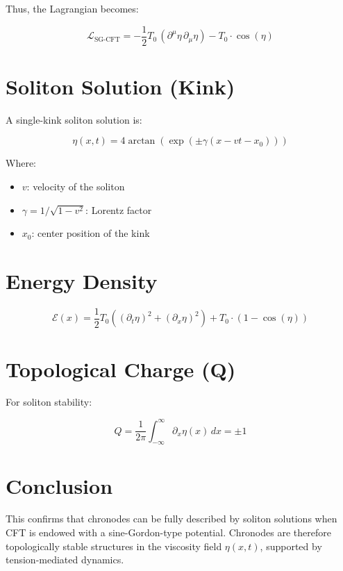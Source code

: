 \documentclass{article}
\begin{document}
Thus, the Lagrangian becomes:

\[
\mathcal{L}_{\text{SG-CFT}} = -\frac{1}{2} T_0 \, (\partial^\mu \eta \, \partial_\mu \eta) - T_0 \cdot \cos(\eta)
\]

\section{Soliton Solution (Kink)}

A single-kink soliton solution is:

\[
\eta(x,t) = 4 \arctan \left( \exp\left( \pm \gamma(x - vt - x_0) \right) \right)
\]

Where:
\begin{itemize}
  \item $v$: velocity of the soliton
  \item $\gamma = 1/\sqrt{1 - v^2}$: Lorentz factor
  \item $x_0$: center position of the kink
\end{itemize}

\section{Energy Density}

\[
\mathcal{E}(x) = \frac{1}{2} T_0 \left( (\partial_t \eta)^2 + (\partial_x \eta)^2 \right) + T_0 \cdot (1 - \cos(\eta))
\]

\section{Topological Charge (Q)}

For soliton stability:

\[
Q = \frac{1}{2\pi} \int_{-\infty}^{\infty} \partial_x \eta(x) \, dx = \pm 1
\]

\section*{Conclusion}

This confirms that chronodes can be fully described by soliton solutions when CFT is endowed with a sine-Gordon-type potential. Chronodes are therefore topologically stable structures in the viscosity field $\eta(x,t)$, supported by tension-mediated dynamics.
\end{document}
